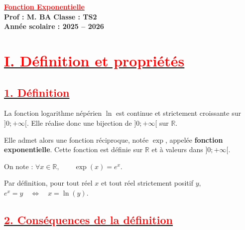 \documentclass[12pt,a4paper]{article}
\begin{document}
\begin{center}
    \Large\textbf{\underline{\textcolor{red}{Fonction Exponentielle}}}\\[-0.1cm]
    \normalsize\textbf{Prof : M. BA} \hfill \textbf{Classe : TS2}\\[-0.1cm]
    \textbf{Année scolaire : 2025 -- 2026}
\end{center}

\section*{\underline{\textbf{\textcolor{red}{I. Définition et propriétés}}}}
\subsection*{\underline{\textbf{\textcolor{red}{1. Définition}}}}

La fonction logarithme népérien \( \ln \) est continue et strictement croissante sur \( ]0;+\infty[ \). Elle réalise donc une bijection de \( ]0;+\infty[ \) sur \( \mathbb{R} \).

Elle admet alors une fonction réciproque, notée \( \exp \), appelée \textbf{fonction exponentielle}. Cette fonction est définie sur \( \mathbb{R} \) et à valeurs dans \( ]0;+\infty[ \).

On note :
\(
\forall x\in\mathbb{R},\qquad \exp(x)=e^x.
\)

Par définition, pour tout réel \(x\) et tout réel strictement positif \(y\),
\(
e^x=y
\quad\Longleftrightarrow\quad
x=\ln(y).
\)
\subsection*{\underline{\textbf{\textcolor{red}{2. Conséquences de la définition}}}}
\end{document}
